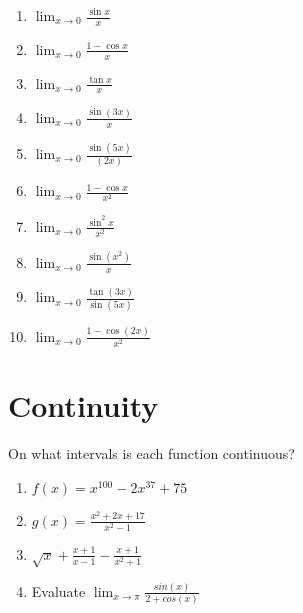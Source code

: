 \documentclass{book}
\begin{document}
\begin{enumerate}
\item $\displaystyle \lim_{x \to 0} \frac{\sin x}{x}$
\item $\displaystyle \lim_{x \to 0} \frac{1 - \cos x}{x}$
\item $\displaystyle \lim_{x \to 0} \frac{\tan x}{x}$
\item $\displaystyle \lim_{x \to 0} \frac{\sin(3x)}{x}$
\item $\displaystyle \lim_{x \to 0} \frac{\sin(5x)}{(2x)}$

\item $\displaystyle \lim_{x \to 0} \frac{1 - \cos x}{x^2}$
\item $\displaystyle \lim_{x \to 0} \frac{\sin^2x}{x^2}$
\item $\displaystyle \lim_{x \to 0} \frac{\sin(x^2)}{x}$
\item $\displaystyle \lim_{x \to 0} \frac{\tan (3x)}{\sin(5x)}$
\item $\displaystyle \lim_{x \to 0} \frac{1 - \cos(2x)}{x^2}$
\end{enumerate}

\vspace{1.5cm}


\section{Continuity}
On what intervals is each function continuous?
\vspace{0.3cm}
\begin{enumerate}
    \item $\displaystyle {f(x) = x^{100} - 2x^{37} + 75}$
    \item $\displaystyle {g(x) = } \frac{x^2 + 2x + 17}{x^2 - 1}$
    \item $\displaystyle \sqrt{x} + \frac{x+1}{x-1} - \frac{x+1}{x^2 + 1}$
    \vspace{0.3cm}
    \item Evaluate $\displaystyle \lim_{x \to \pi} \frac{sin(x)}{2 + cos(x)}$
    
\end{enumerate}

\vspace{0.3cm}
\end{document}
